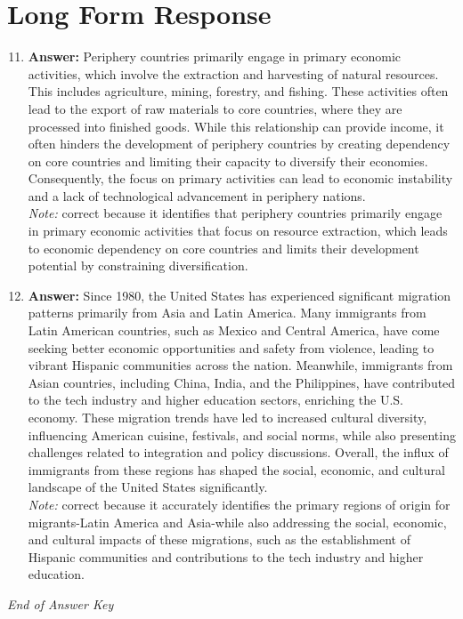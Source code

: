 \documentclass[12pt]{article}
\begin{document}
\section*{Long Form Response}
\begin{enumerate}[label=\arabic*.]
\setcounter{enumi}{10}
\item \textbf{Answer:} Periphery countries primarily engage in primary economic activities, which involve the extraction and harvesting of natural resources. This includes agriculture, mining, forestry, and fishing. These activities often lead to the export of raw materials to core countries, where they are processed into finished goods. While this relationship can provide income, it often hinders the development of periphery countries by creating dependency on core countries and limiting their capacity to diversify their economies. Consequently, the focus on primary activities can lead to economic instability and a lack of technological advancement in periphery nations.
\\ \textit{Note:} correct because it identifies that periphery countries primarily engage in primary economic activities that focus on resource extraction, which leads to economic dependency on core countries and limits their development potential by constraining diversification.
\item \textbf{Answer:} Since 1980, the United States has experienced significant migration patterns primarily from Asia and Latin America. Many immigrants from Latin American countries, such as Mexico and Central America, have come seeking better economic opportunities and safety from violence, leading to vibrant Hispanic communities across the nation. Meanwhile, immigrants from Asian countries, including China, India, and the Philippines, have contributed to the tech industry and higher education sectors, enriching the U.S. economy. These migration trends have led to increased cultural diversity, influencing American cuisine, festivals, and social norms, while also presenting challenges related to integration and policy discussions. Overall, the influx of immigrants from these regions has shaped the social, economic, and cultural landscape of the United States significantly.
\\ \textit{Note:} correct because it accurately identifies the primary regions of origin for migrants-Latin America and Asia-while also addressing the social, economic, and cultural impacts of these migrations, such as the establishment of Hispanic communities and contributions to the tech industry and higher education.
\end{enumerate}

\vfill
\noindent\textit{End of Answer Key}
\end{document}
